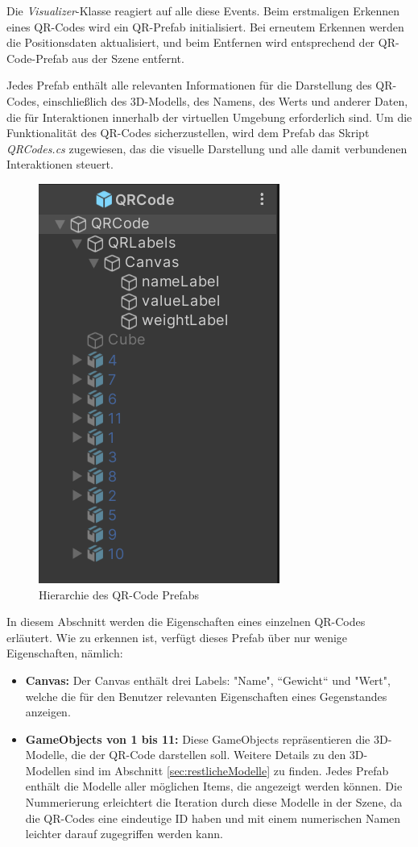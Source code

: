 \begin{itemize}
Die \textit{Visualizer}-Klasse reagiert auf alle diese Events. Beim erstmaligen Erkennen eines QR-Codes wird ein QR-Prefab initialisiert. Bei erneutem Erkennen werden die Positionsdaten aktualisiert, und beim Entfernen wird entsprechend der QR-Code-Prefab aus der Szene entfernt.

Jedes Prefab enthält alle relevanten Informationen für die Darstellung des QR-Codes, einschließlich des 3D-Modells, des Namens, des Werts und anderer Daten, die für Interaktionen innerhalb der virtuellen Umgebung erforderlich sind. Um die Funktionalität des QR-Codes sicherzustellen, wird dem Prefab das Skript \textit{QRCodes.cs} zugewiesen, das die visuelle Darstellung und alle damit verbundenen Interaktionen steuert.

\begin{figure}[H]
    \centering
    \includegraphics[scale=0.6, angle=0]{images/qrprefab}
    \caption{Hierarchie des QR-Code Prefabs}
    \label{fig:qrprefab}
\end{figure}


In diesem Abschnitt werden die Eigenschaften eines einzelnen QR-Codes erläutert. Wie zu erkennen ist, verfügt dieses Prefab über nur wenige Eigenschaften, nämlich:
\begin{itemize}
    \item \textbf{Canvas:} Der Canvas enthält drei Labels: "Name", ``Gewicht`` und "Wert", welche die für den Benutzer relevanten Eigenschaften eines Gegenstandes anzeigen.
    \item \textbf{GameObjects von 1 bis 11:} Diese GameObjects repräsentieren die 3D-Modelle, die der QR-Code darstellen soll. Weitere Details zu den 3D-Modellen sind im Abschnitt \ref{sec:restlicheModelle} zu finden. Jedes Prefab enthält die Modelle aller möglichen Items, die angezeigt werden können. Die Nummerierung erleichtert die Iteration durch diese Modelle in der Szene, da die QR-Codes eine eindeutige ID haben und mit einem numerischen Namen leichter darauf zugegriffen werden kann.
\end{itemize}


\end{itemize}
